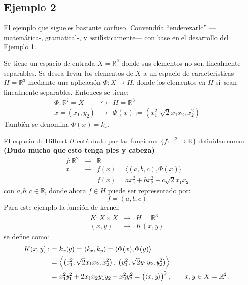 \subsection{Ejemplo 2}

{\color{red} 
El ejemplo que sigue es bastante confuso.
Convendr\'\i a ``enderezarlo'' ---matem\'atica-, gramatical-,
y estil\'\i sticamente--- con base en el desarrollo del
Ejemplo 1.

\smallskip\noindent
Se tiene un espacio de entrada $X=\mathbb{R}^2$ donde sus elementos
no son linealmente separables. 
Se desea llevar los elementos de $X$ a un espacio de caracter\'\i sticas
$H=\mathbb{R}^3$ mediante una aplicaci\'on 
$\Phi:X\to H$, donde los elementos en $H$ s\'\i\ sean linealmente
separables. 
Entonces se tiene:
\begin{eqnarray*}
\Phi: \mathbb{R}^2=X &\hookrightarrow &H=\mathbb{R}^3 \\
x=(x_1,y_2) &\rightarrow & \Phi(x):=(x_1^2,\sqrt{2}x_1 x_2,x_2^2)
\end{eqnarray*}
Tambi\'en se denomina $\Phi(x)=k_x$.


\smallskip\noindent
El espacio de Hilbert $H$ est\'a dado por las funciones
$\{f:\mathbb{R}^2 \rightarrow \mathbb{R}\}$ definidas como:
{\bf (Dudo mucho que esto tenga pies y cabeza)} 
\begin{eqnarray*}
f: \mathbb{R}^2 &\rightarrow& \mathbb{R} \\
x &\rightarrow& f(x) = \langle (a,b,c), \Phi(x)\rangle \\
& & f(x) = a x_1^2 + b x_2 ^2 + c \sqrt{2} x_1 x_2
\end{eqnarray*}
con $a,b,c\in\mathbb{R}$, donde ahora $f\in H$ puede ser representado
por:
\begin{equation}
f= (a,b,c)
\end{equation}
Para este ejemplo la funci\'on de kernel:
\begin{eqnarray*}
K: X \times X &\rightarrow &H=\mathbb{R}^3 \\
    (x,y) &\rightarrow & K(x,y)
\end{eqnarray*}
se define como:
\begin{align*}\smash[t]
K(x,y):
&= k_x(y)
 = \langle k_x, k_y \rangle
 = \langle \Phi(x), \Phi(y) \rangle \\
&= \left\langle \big( x_1^2,\sqrt{2}x_1 x_2,x_2^2 \big)\,,\;
                \big( y_1^2,\sqrt{2}y_1 y_2,y_2^2 \big) \right\rangle \\
&= x_1^2 y_1^2 + 2x_1x_2y_1 y_2 + x_2^2 y_2^2
 = \big(\langle x,y \rangle \big)^2\,,\qquad x,y\in X=\mathbb{R}^2\,.
\end{align*}
}



